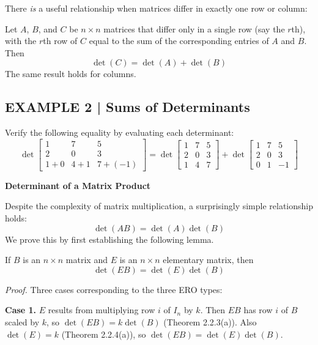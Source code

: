 \documentclass{article}
\newcommand{\redheading}[1]{{\vspace{2mm}\noindent\Large\bfseries\color{red!55!black} #1\par}\vspace{2mm}}
\theoremstyle{mystyle}
\begin{document}
There \emph{is} a useful relationship when matrices differ in exactly one row or column:

\begin{tcolorbox}[colback=red!4, colframe=red!60!black,
  title={\textbf{Theorem 2.3.1}}, boxrule=0.5mm, arc=3mm]
Let $A$, $B$, and $C$ be $n\times n$ matrices that differ only in a single row (say the
$r$th), with the $r$th row of $C$ equal to the sum of the corresponding entries of
$A$ and $B$. Then
\[
\det(C)=\det(A)+\det(B)
\]
The same result holds for columns.
\end{tcolorbox}

\subsection*{EXAMPLE 2 | Sums of Determinants}

Verify the following equality by evaluating each determinant:
\[
\det\begin{bmatrix}1&7&5\\2&0&3\\1+0&4+1&7+(-1)\end{bmatrix}
=\det\begin{bmatrix}1&7&5\\2&0&3\\1&4&7\end{bmatrix}
+\det\begin{bmatrix}1&7&5\\2&0&3\\0&1&-1\end{bmatrix}
\]

\redheading{Determinant of a Matrix Product}

Despite the complexity of matrix multiplication, a surprisingly simple relationship holds:
\begin{equation}
\det(AB)=\det(A)\det(B) \tag{2}
\end{equation}
We prove this by first establishing the following lemma.

\begin{tcolorbox}[colback=red!4, colframe=red!60!black,
  title={\textbf{Lemma 2.3.2}}, boxrule=0.5mm, arc=3mm]
If $B$ is an $n\times n$ matrix and $E$ is an $n\times n$ elementary matrix, then
\[
\det(EB)=\det(E)\det(B)
\]
\end{tcolorbox}

\textit{Proof.} Three cases corresponding to the three ERO types:

\textbf{Case 1.} $E$ results from multiplying row $i$ of $I_n$ by $k$. Then $EB$ has
row $i$ of $B$ scaled by $k$, so $\det(EB)=k\det(B)$ (Theorem 2.2.3(a)).
Also $\det(E)=k$ (Theorem 2.2.4(a)), so $\det(EB)=\det(E)\det(B)$.
\end{document}
